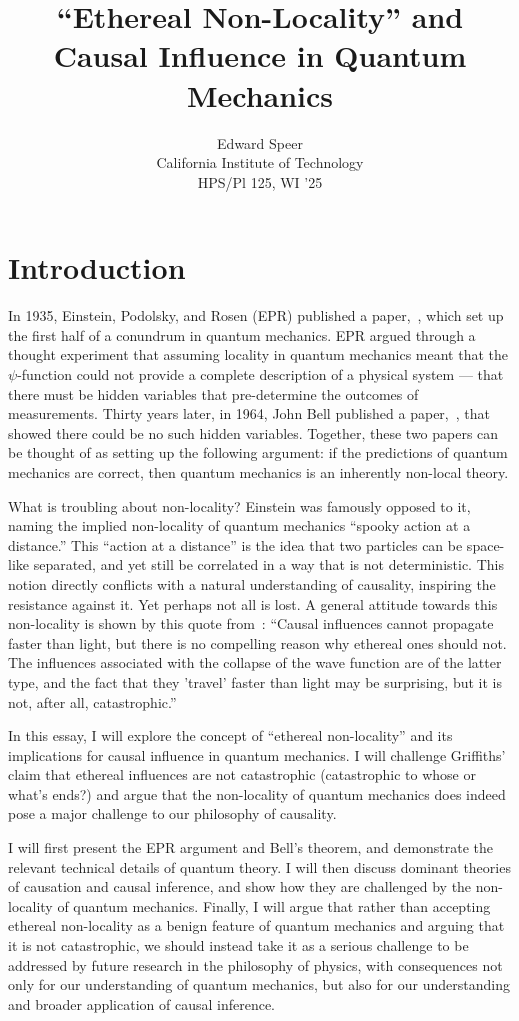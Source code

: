 \documentclass[11pt, a4paper]{article}
\title{``Ethereal Non-Locality'' and Causal Influence in Quantum Mechanics}
\author{%
  Edward Speer
  \\
  California Institute of Technology\\
  HPS/Pl 125, WI '25 \\
}
\date{\monthyeardate}
\begin{document}
\maketitle

\section{Introduction}
In 1935, Einstein, Podolsky, and Rosen (EPR) published a paper,~\cite{EPR_1935},
which set up the first half of a conundrum in quantum mechanics. EPR argued
through a thought experiment that assuming locality in quantum mechanics meant 
that the $\psi$-function could not provide a complete description of a physical
system — that there must be hidden variables that pre-determine the outcomes of
measurements. Thirty years later, in 1964, John Bell published a
paper,~\cite{Bell_1964}, that showed there could be no such hidden variables. 
Together, these two papers can be thought of as setting up the following
argument: if the predictions of quantum mechanics are correct, then quantum 
mechanics is an inherently non-local theory. 

What is troubling about non-locality? Einstein was famously opposed to it,
naming the implied non-locality of quantum mechanics ``spooky action at a
distance.'' This ``action at a distance'' is the idea that two particles can be
space-like separated, and yet still be correlated in a way that is not
deterministic. This notion directly conflicts with a natural understanding of
causality, inspiring the resistance against it. Yet perhaps not all is lost. 
A general attitude towards this non-locality is shown by this quote
from~\cite{Griffiths_2020}: ``Causal influences cannot propagate faster than
light, but there is no compelling reason why ethereal ones should not. The 
influences associated with the collapse of the wave function are of the latter
type, and the fact that they 'travel' faster than light may be surprising, but
it is not, after all, catastrophic.''

In this essay, I will explore the concept of ``ethereal non-locality'' and its
implications for causal influence in quantum mechanics. I will challenge 
Griffiths' claim that ethereal influences are not catastrophic (catastrophic to
whose or what's ends?) and argue that the non-locality of quantum mechanics does 
indeed pose a major challenge to our philosophy of causality.

I will first present the EPR argument and Bell's theorem, and demonstrate the 
relevant technical details of quantum theory. I will then discuss dominant
theories of causation and causal inference, and show how they are challenged by
the non-locality of quantum mechanics. Finally, I will argue that rather than 
accepting ethereal non-locality as a benign feature of quantum mechanics and 
arguing that it is not catastrophic, we should instead take it as a serious
challenge to be addressed by future research in the philosophy of physics, with 
consequences not only for our understanding of quantum mechanics, but also for
our understanding and broader application of causal inference.
\end{document}
